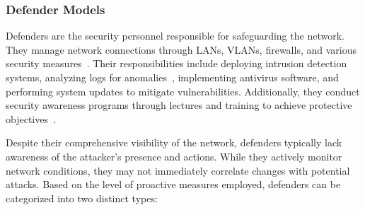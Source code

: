 
\subsubsection{Defender Models}
Defenders are the security personnel responsible for safeguarding the network. 
They manage network connections through LANs, VLANs, firewalls, and various security measures~\cite{terranova2024leveraging, furfaro2017using}. Their responsibilities include deploying intrusion detection systems, analyzing logs for anomalies~\cite{ghanem2022towards}, implementing antivirus software, and performing system updates to mitigate vulnerabilities. Additionally, they conduct security awareness programs through lectures and training to achieve protective objectives~\cite{dillon2022perihack}.

Despite their comprehensive visibility of the network, defenders typically lack awareness of the attacker's presence and actions. While they actively monitor network conditions, they may not immediately correlate changes with potential attacks. Based on the level of proactive measures employed, defenders can be categorized into two distinct types:




